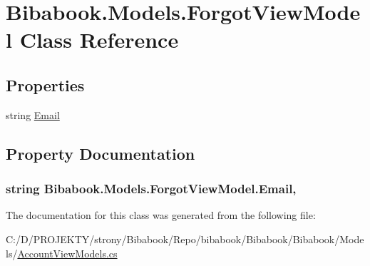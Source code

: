 \hypertarget{class_bibabook_1_1_models_1_1_forgot_view_model}{}\section{Bibabook.\+Models.\+Forgot\+View\+Model Class Reference}
\label{class_bibabook_1_1_models_1_1_forgot_view_model}
\subsection*{Properties}
\begin{DoxyCompactItemize}
\item 
string \hyperlink{class_bibabook_1_1_models_1_1_forgot_view_model_a8d32a22a70282479234b22c7be85b576}{Email}
\end{DoxyCompactItemize}


\subsection{Property Documentation}
\hypertarget{class_bibabook_1_1_models_1_1_forgot_view_model_a8d32a22a70282479234b22c7be85b576}{}
\subsubsection[{Email}]{\setlength{\rightskip}{0pt plus 5cm}string Bibabook.\+Models.\+Forgot\+View\+Model.\+Email\hspace{0.3cm}{\ttfamily [get]}, {\ttfamily [set]}}\label{class_bibabook_1_1_models_1_1_forgot_view_model_a8d32a22a70282479234b22c7be85b576}


The documentation for this class was generated from the following file\+:\begin{DoxyCompactItemize}
\item 
C\+:/\+D/\+P\+R\+O\+J\+E\+K\+T\+Y/strony/\+Bibabook/\+Repo/bibabook/\+Bibabook/\+Bibabook/\+Models/\hyperlink{_account_view_models_8cs}{Account\+View\+Models.\+cs}\end{DoxyCompactItemize}

